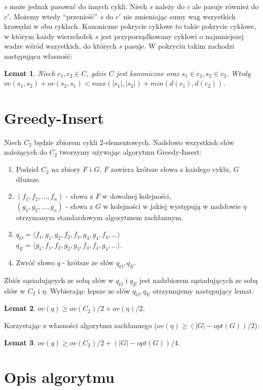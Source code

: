 \documentclass[12pt]{article}
\newtheorem{lemma}{Lemat}[section]
\begin{document}
$s$ może jednak pasować do innych cykli.
Niech $s$ należy do $c$ ale pasuje również do $c'$.
Możemy wtedy ``przenieść'' $s$ do $c'$ nie zmieniając sumy wag wszystkich krawędzi w obu cyklach.
Kanoniczne pokrycie cyklowe to takie pokrycie cyklowe, w którym każdy wierzchołek $s$ jest przyporządkowany cyklowi o najmniejszej wadze wśród wszystkich, do których $s$ pasuje.
W pokryciu takim zachodzi następująca własność:
\begin{lemma}
Niech $c_1,c_2 \in C$, gdzie $C$ jest kanoniczne oraz $s_1 \in c_1, s_2 \in c_2$.
Wtedy $ov(s_1,s_2)+ov(s_2,s_1) < max(|s_1|,|s_2|)+min(d(c_1),d(c_2))$.
\end{lemma}

\section{Greedy-Insert}

Niech $C_2$ będzie zbiorem cykli 2-elementowych.
Nadsłowo wszystkich słów należących do $C_2$ tworzymy używając algorytmu Greedy-Insert:
\begin{enumerate}
\item Podziel $C_2$ na zbiory $F$ i $G$. $F$ zawiera krótsze słowa z każdego cyklu, $G$ dłuższe.
\item $(f_1,f_2,\dots,f_n)$ - słowa z $F$ w dowolnej kolejności, \\
      $(g_1,g_2,\dots,g_n)$ - słowa z $G$ w kolejności w jakiej występują w nadsłowie $\eta$ otrzymanym standardowym algorytmem zachłannym.
\item $q_O=\langle f_1,g_1,g_2,f_2,f_3,g_3,g_4,f_4,\dots \rangle$ \\
      $q_E=\langle g_1,f_1,f_2,g_2,g_3,f_3,f_4,g_4,\dots \rangle$.
\item Zwróć słowo $q$ - krótsze ze słów $q_O,q_E$.
\end{enumerate}
Zbiór sąsiadujących ze sobą słów w $q_O$ i $q_E$ jest nadzbiorem sąsiadujących ze sobą słów w $C_2$ i $\eta$.
Wybierając lepsze ze słów $q_O,q_E$ otrzymujemy następujący lemat:
\begin{lemma}
$ov(q) \geq ov(C_2)/2 + ov(\eta)/2$.
\end{lemma}
Korzystając z własności algorytmu zachłannego ($ov(\eta) \geq (|G|-opt(G))/2$):
\begin{lemma}
$ov(q) \geq ov(C_2)/2 + (|G|-opt(G))/4$.
\end{lemma}

\section{Opis algorytmu}
\end{document}
